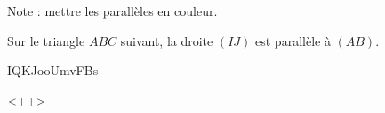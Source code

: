 



Note : mettre les parallèles en couleur.

\begin{theorem}
    Sur le triangle \( ABC\) suivant, la droite \( (IJ)\) est parallèle à \( (AB)\).

IQKJooUmvFBs

\end{theorem}
<++>
